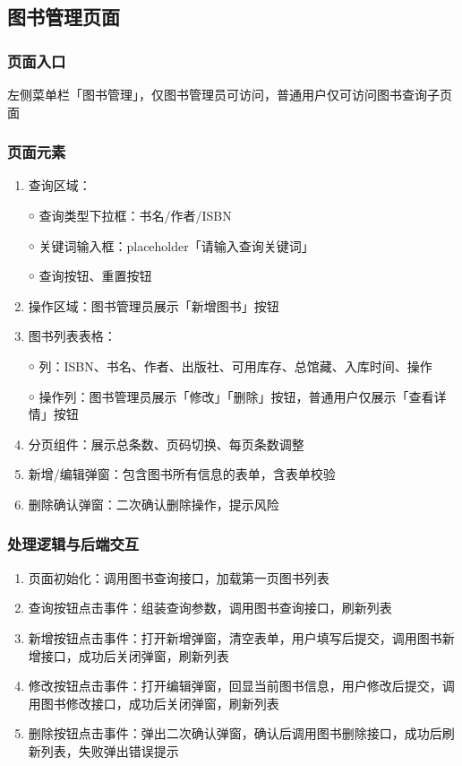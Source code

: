 \documentclass[12pt, a4paper]{article}
\begin{document}
\subsection{图书管理页面}

\subsubsection{页面入口}

左侧菜单栏「图书管理」，仅图书管理员可访问，普通用户仅可访问图书查询子页面

\subsubsection{页面元素}

\begin{enumerate}
\item  查询区域：

￮ 查询类型下拉框：书名/作者/ISBN

￮ 关键词输入框：placeholder「请输入查询关键词」

￮ 查询按钮、重置按钮

\item  操作区域：图书管理员展示「新增图书」按钮

\item  图书列表表格：

￮ 列：ISBN、书名、作者、出版社、可用库存、总馆藏、入库时间、操作

￮ 操作列：图书管理员展示「修改」「删除」按钮，普通用户仅展示「查看详情」按钮

\item  分页组件：展示总条数、页码切换、每页条数调整

\item  新增/编辑弹窗：包含图书所有信息的表单，含表单校验

\item  删除确认弹窗：二次确认删除操作，提示风险
\end{enumerate}

\subsubsection{处理逻辑与后端交互}

\begin{enumerate}
\item  页面初始化：调用图书查询接口，加载第一页图书列表

\item  查询按钮点击事件：组装查询参数，调用图书查询接口，刷新列表

\item  新增按钮点击事件：打开新增弹窗，清空表单，用户填写后提交，调用图书新增接口，成功后关闭弹窗，刷新列表

\item  修改按钮点击事件：打开编辑弹窗，回显当前图书信息，用户修改后提交，调用图书修改接口，成功后关闭弹窗，刷新列表

\item  删除按钮点击事件：弹出二次确认弹窗，确认后调用图书删除接口，成功后刷新列表，失败弹出错误提示
\end{enumerate}
\end{document}
